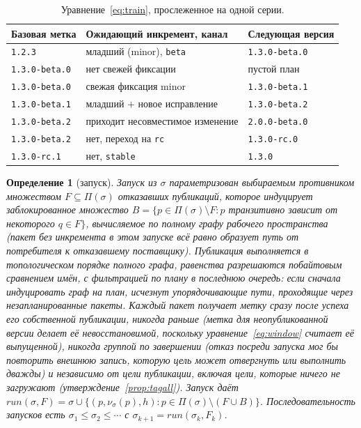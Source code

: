 \documentclass[sigconf,nonacm]{acmart}
\theoremstyle{acmplain}
\theoremstyle{acmdefinition}
\newtheorem{definition}[theorem]{Определение}
\theoremstyle{acmplain}
\newcommand{\code}[1]{\texttt{#1}}
\begin{document}
\begin{table}[t]
\caption{Уравнение~\ref{eq:train}, прослеженное на одной серии.}
\label{tab:train}
\small
\begin{tabularx}{\columnwidth}{@{}lYY@{}}
\toprule
Базовая метка & Ожидающий инкремент, канал & Следующая версия \\
\midrule
\code{1.2.3}        & младший (minor), \code{beta}     & \code{1.3.0-beta.0} \\
\code{1.3.0-beta.0} & нет свежей фиксации              & пустой план \\
\code{1.3.0-beta.0} & свежая фиксация minor            & \code{1.3.0-beta.1} \\
\code{1.3.0-beta.1} & младший $+$ новое исправление    & \code{1.3.0-beta.2} \\
\code{1.3.0-beta.2} & приходит несовместимое изменение & \code{2.0.0-beta.0} \\
\code{1.3.0-beta.2} & нет, переход на \code{rc}        & \code{1.3.0-rc.0} \\
\code{1.3.0-rc.1}   & нет, \code{stable}               & \code{1.3.0} \\
\bottomrule
\end{tabularx}
\end{table}

\begin{definition}[запуск]
\label{def:run}
Запуск из $\sigma$ параметризован выбираемым противником множеством
$F \subseteq \Pi(\sigma)$ отказавших публикаций, которое индуцирует
заблокированное множество
$B = \{p \in \Pi(\sigma) \setminus F : p$ транзитивно зависит от некоторого
$q \in F\}$, вычисляемое по \emph{полному} графу рабочего пространства (пакет
без инкремента в этом запуске всё равно образует путь от потребителя к отказавшему
поставщику). Публикация выполняется в топологическом порядке полного
графа, равенства разрешаются побайтовым сравнением имён, с фильтрацией по плану \emph{в последнюю очередь}:
если сначала индуцировать граф на план, исчезнут упорядочивающие пути, проходящие
через незапланированные пакеты. Каждый пакет получает метку сразу после успеха его
собственной публикации, никогда раньше (метка для неопубликованной версии
делает её невосстановимой, поскольку уравнение~\ref{eq:window} считает её
выпущенной), никогда группой по завершении (отказ посреди запуска мог бы
повторить внешнюю запись, которую цель может отвергнуть или выполнить дважды) и \emph{независимо от цели публикации},
включая цели, которые ничего не загружают
(утверждение~\ref{prop:tagall}). Запуск даёт
$\mathit{run}(\sigma,F) = \sigma \cup \{(p, \nu_\sigma(p), h) : p \in
\Pi(\sigma) \setminus (F \cup B)\}$. \emph{Последовательность запусков} есть
$\sigma_1 \leq \sigma_2 \leq \cdots$ с $\sigma_{k+1} =
\mathit{run}(\sigma_k, F_k)$.
\end{definition}
\end{document}
